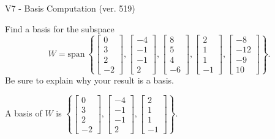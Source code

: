 \begin{exercise}
  \begin{exerciseTitle}V7 - Basis Computation (ver. 519)\end{exerciseTitle}
  \begin{exerciseStatement}
    Find a basis for the subspace 
\[W=\mathrm{span}\ \left\{\left[\begin{array}{r}
0 \\
3 \\
2 \\
-2
\end{array}\right] , \left[\begin{array}{r}
-4 \\
-1 \\
-1 \\
2
\end{array}\right] , \left[\begin{array}{r}
8 \\
5 \\
4 \\
-6
\end{array}\right] , \left[\begin{array}{r}
2 \\
1 \\
1 \\
-1
\end{array}\right] , \left[\begin{array}{r}
-8 \\
-12 \\
-9 \\
10
\end{array}\right]\right\}.\]
 Be sure to explain why your result is a basis.


  \end{exerciseStatement}
  \begin{exerciseAnswer}
   A basis of \(W\) is  \(\left\{\left[\begin{array}{r}
0 \\
3 \\
2 \\
-2
\end{array}\right] , \left[\begin{array}{r}
-4 \\
-1 \\
-1 \\
2
\end{array}\right] , \left[\begin{array}{r}
2 \\
1 \\
1 \\
-1
\end{array}\right]\right\}\).
  


  \end{exerciseAnswer}
\end{exercise}
